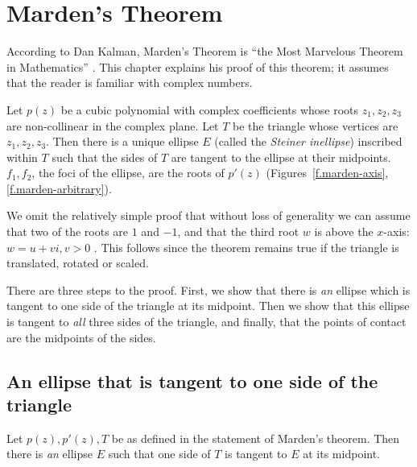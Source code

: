 
\chapter{Marden's Theorem}\label{s.marden}

According to Dan Kalman, Marden's Theorem is ``the Most Marvelous
Theorem in Mathematics'' \cite{marden-marvelous}. This chapter explains his proof of this theorem; it assumes that the reader is familiar with complex numbers.

\begin{theorem}[Marden]\label{thm.marden}
Let $p(z)$ be a cubic polynomial with complex coefficients whose roots $z_1,z_2,z_3$ are non-collinear in the complex plane. Let $T$ be the triangle whose vertices are $z_1,z_2,z_3$. Then there is a unique ellipse $E$ (called the \emph{Steiner inellipse}) inscribed within $T$ such that the sides of $T$ are tangent to the ellipse at their midpoints. $f_1,f_2$, the foci of the ellipse, are the roots of $p'(z)$ (Figures~\ref{f.marden-axis}, \ref{f.marden-arbitrary}).
\end{theorem}
We omit the relatively simple proof that without loss of generality we can assume that two of the roots are $1$ and $-1$, and that the third root $w$ is above the $x$-axis: $w=u+vi,v>0$  \cite[p.~332]{marden}. This follows since the theorem remains true if the triangle is translated, rotated or scaled.

There are three steps to the proof. First, we show that there is \emph{an} ellipse which is tangent to one side of the triangle at its midpoint. Then we show that this ellipse is tangent to \emph{all} three sides of the triangle, and finally, that the points of contact are the midpoints of the sides.

\section{An ellipse that is tangent to one side of the triangle}

\begin{theorem}\label{thm.marden1}
Let $p(z),p'(z),T$ be as defined in the statement of Marden's theorem. Then there is \emph{an} ellipse $E$ such that one side of $T$ is tangent to $E$ at its midpoint.
\end{theorem}


